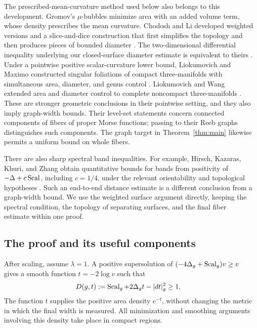 The prescribed-mean-curvature method used below also belongs to this
development. Gromov's $\mu$-bubbles minimize area with an added volume
term, whose density prescribes the mean curvature. Chodosh and Li
developed weighted versions and a slice-and-dice construction that first
simplifies the topology and then produces pieces of bounded diameter
\cite[Sections~3--6]{ChodoshLi2024}. The two-dimensional differential
inequality underlying our closed-surface diameter estimate is
equivalent to theirs \cite[Lemma~16]{ChodoshLi2024}. Under a pointwise
positive scalar-curvature lower bound, Liokumovich and Maximo constructed
singular foliations of compact three-manifolds with simultaneous area,
diameter, and genus control \cite{LiokumovichMaximo2023}.
Liokumovich and Wang extended area and diameter control to complete
noncompact three-manifolds \cite{LiokumovichWang2026}. These are stronger
geometric conclusions in their pointwise setting, and they also imply
graph-width bounds. Their level-set statements concern connected
components of fibers of proper Morse functions; passing to their Reeb
graphs distinguishes such components. The graph target in
Theorem~\ref{thm:main} likewise permits a uniform bound on whole fibers.

There are also sharp spectral band inequalities. For example,
Hirsch, Kazaras, Khuri, and Zhang obtain quantitative bounds for bands
from positivity of $-\Delta+c\operatorname{Scal}$, including $c=1/4$, under the
relevant orientability and topological hypotheses
\cite{HirschKazarasKhuriZhang2024}. Such an end-to-end distance estimate
is a different conclusion from a graph-width bound. We use the
weighted surface argument directly, keeping the spectral condition,
the topology of separating surfaces, and the final fiber estimate
within one proof.

\subsection{The proof and its useful components}

After scaling, assume $\lambda=1$. A positive supersolution of
$(-4\Delta_g+\operatorname{Scal}_g)v\ge v$ gives a smooth function $t=-2\log v$
such that
\begin{equation}\label{eq:intro-weighted-scalar}
 D(g,t):=\operatorname{Scal}_g+2\Delta_g t-|dt|_g^2\ge1.
\end{equation}
The function $t$ supplies the positive area density $e^{-t}$, without
changing the metric in which the final width is measured. All
minimization and smoothing arguments involving this density take
place in compact regions.

